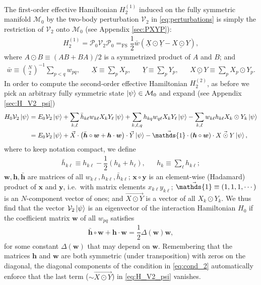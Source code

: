 \documentclass[nofootinbib,notitlepage,11pt]{revtex4-2}
\newcommand{\f}[2]{\dfrac{#1}{#2}} %
\newcommand{\p}[1]{\left(#1\right)} %
\renewcommand{\c}{\cdot} %
\renewcommand{\oc}{\circ} %
\newcommand{\m}{\bm} %
\renewcommand{\v}{\vec} %
\newcommand{\1}{\mathds{1}}
\newcommand{\M}{\mathcal{M}}
\renewcommand{\P}{\mathcal{P}}
\newcommand{\V}{\mathcal{V}}
\newcommand{\EQFS}{=_{\text{FS}}}
\newcommand{\col}{\underline}
\begin{document}
The first-order effective Hamiltonian $H_2^{(1)}$ induced on the fully
symmetric manifold $\M_0$ by the two-body perturbation $\V_2$ in
\eqref{eq:perturbations} is simply the restriction of $\V_2$ onto
$\M_0$ (see Appendix \ref{sec:PXYP}):
\begin{align}
  H_2^{(1)}
  = \P_0 \V_2 \P_0
  \EQFS \f12 \bar w \p{\col{X}\odot\col{Y} - \col{X\odot Y}},
\end{align}
where $A\odot B\equiv\p{AB+BA}/2$ is a symmetrized product of $A$ and
$B$; and
\begin{align}
  \bar w \equiv {N\choose 2}^{-1} \sum_{p<q} w_{pq},
  &&
  \col{X} \equiv \sum_p X_p,
  &&
  \col{Y} \equiv \sum_p Y_p,
  &&
  \col{X\odot Y} \equiv \sum_p X_p\odot Y_p.
\end{align}
In order to compute the second-order effective Hamiltonian
$H_2^{(2)}$, as before we pick an arbitrary fully symmetric state
$\ket\psi\in\M_0$ and expand (see Appendix \ref{sec:H_V2_psi})
\begin{align}
  H_0 \V_2 \ket\psi
  &= E_0 \V_2 \ket\psi
  + \sum_{k,\ell} \bar h_{k\ell} w_{k\ell} X_k Y_\ell \ket\psi
  + \sum_{k,\ell,q} h_{kq} w_{q\ell} X_k Y_\ell \ket\psi
  - \sum_{k,\ell} w_{k\ell} h_{k\ell} X_k \odot Y_k \ket\psi \\
  &= E_0 \V_2 \ket\psi
  + \v X \c \p{\bar{\m h}\oc\m w + \m h\c\m w} \c \v Y \ket\psi
  - \v\1 \c \p{\m h\oc\m w} \c \v{X\odot Y} \ket\psi,
  \label{eq:H_V2_psi}
\end{align}
where to keep notation compact, we define
\begin{align}
  \bar h_{k\ell} \equiv h_{k\ell} - \f12\p{h_k + h_\ell},
  &&
  h_k \equiv \sum_\ell h_{k\ell};
\end{align}
$\m w,\m h,\bar{\m h}$ are matrices of all
$w_{k\ell},h_{k\ell},\bar h_{k\ell}$; $\m x\oc\m y$ is an element-wise
(Hadamard) product of $\m x$ and $\m y$, i.e.~with matrix elements
$x_{k\ell} y_{k\ell}$; $\v\1\equiv\p{1,1,1,\cdots}$ is an
$N$-component vector of ones; and $\v{X\odot Y}$ is a vector of all
$X_k\odot Y_k$.  We thus find that the vector $\V_2\ket\psi$ is an
eigenvector of the interaction Hamiltonian $H_0$ if the coefficient
matrix $\m w$ of all $w_{pq}$ satisfies
\begin{align}
  \bar{\m h}\oc\m w + \m h\c\m w = \f12 \Delta\p{\m w} \m w,
  \label{eq:cond_2}
\end{align}
for some constant $\Delta\p{\m w}$ that may depend on $\m w$.
Remembering that the matrices $\m h$ and $\m w$ are both symmetric
(under transposition) with zeros on the diagonal, the diagonal
components of the condition in \eqref{eq:cond_2} automatically enforce
that the last term ($\sim\v{X\odot Y}$) in \eqref{eq:H_V2_psi}
vanishes.
\end{document}
